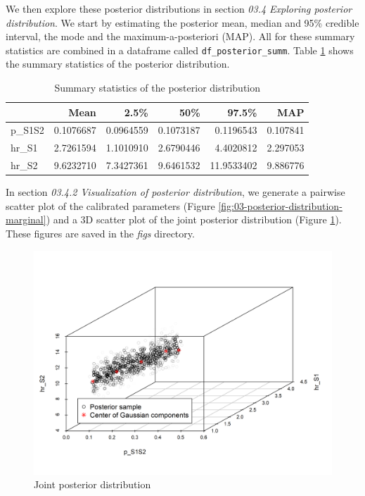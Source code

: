 \documentclass[]{book}
\begin{document}
We then explore these posterior distributions in section \emph{03.4
Exploring posterior distribution}. We start by estimating the posterior
mean, median and 95\% credible interval, the mode and the
maximum-a-posteriori (MAP). All for these summary statistics are
combined in a dataframe called \texttt{df\_posterior\_summ}. Table
\ref{tab:SummaryCal} shows the summary statistics of the posterior
distribution.

\begin{table}[!h]

\caption{\label{tab:SummaryCal}Summary statistics of the posterior distribution}
\centering
\begin{tabular}{l|r|r|r|r|r}
\hline
  & Mean & 2.5\% & 50\% & 97.5\% & MAP\\
\hline
p\_S1S2 & 0.1076687 & 0.0964559 & 0.1073187 & 0.1196543 & 0.107841\\
\hline
hr\_S1 & 2.7261594 & 1.1010910 & 2.6790446 & 4.4020812 & 2.297053\\
\hline
hr\_S2 & 9.6232710 & 7.3427361 & 9.6461532 & 11.9533402 & 9.886776\\
\hline
\end{tabular}
\end{table}

In section \emph{03.4.2 Visualization of posterior distribution}, we
generate a pairwise scatter plot of the calibrated parameters (Figure
\ref{fig:03-posterior-distribution-marginal}) and a 3D scatter plot of
the joint posterior distribution (Figure
\ref{fig:Posterior-distribution-joint}). These figures are saved in the
\emph{figs} directory.

\begin{figure}[h]

{\centering \includegraphics[width=1\linewidth]{../figs/03_posterior_distribution_joint} 

}

\caption{Joint posterior distribution}\label{fig:Posterior-distribution-joint}
\end{figure}
\end{document}
